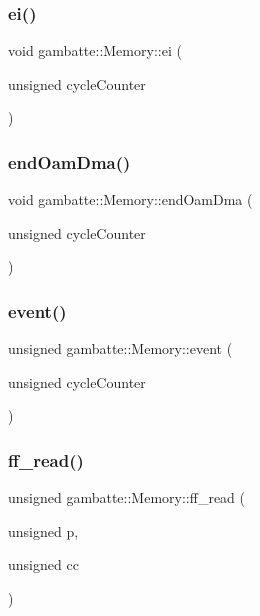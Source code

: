 \subsubsection{\texorpdfstring{ei()}{ei()}}
{\footnotesize\ttfamily void gambatte\+::\+Memory\+::ei (\begin{DoxyParamCaption}\item[{unsigned}]{cycle\+Counter }\end{DoxyParamCaption})\hspace{0.3cm}{\ttfamily [inline]}}

\mbox{\label{classgambatte_1_1Memory_a63ef4bb208fcaf48541c916fbdfd70e9}} 
\subsubsection{\texorpdfstring{end\+Oam\+Dma()}{endOamDma()}}
{\footnotesize\ttfamily void gambatte\+::\+Memory\+::end\+Oam\+Dma (\begin{DoxyParamCaption}\item[{unsigned}]{cycle\+Counter }\end{DoxyParamCaption})\hspace{0.3cm}{\ttfamily [private]}}

\mbox{\label{classgambatte_1_1Memory_ad5bda65c2e16fb12d8caf402aa851211}} 
\subsubsection{\texorpdfstring{event()}{event()}}
{\footnotesize\ttfamily unsigned gambatte\+::\+Memory\+::event (\begin{DoxyParamCaption}\item[{unsigned}]{cycle\+Counter }\end{DoxyParamCaption})}

\mbox{\label{classgambatte_1_1Memory_a2b2660fe50e46ec79c445e55ef3973a5}} 
\subsubsection{\texorpdfstring{ff\+\_\+read()}{ff\_read()}}
{\footnotesize\ttfamily unsigned gambatte\+::\+Memory\+::ff\+\_\+read (\begin{DoxyParamCaption}\item[{unsigned}]{p,  }\item[{unsigned}]{cc }\end{DoxyParamCaption})\hspace{0.3cm}{\ttfamily [inline]}}

